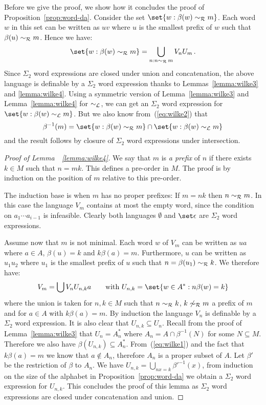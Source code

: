 \documentclass{LMCS}
\begin{document}
Before we give the proof, we show how it concludes the proof of
Proposition~\ref{prop:word-da}. Consider the set  $\set{w : \beta(w) \rgreensim
  m}$. Each word $w$ in this set can be written as $uv$ where $u$ is the
smallest prefix of $w$ such that $\beta(u) \sim_{\mathcal R} m$. Hence we have:
\[
   \set{w : \beta(w) \rgreensim m} = \bigcup_{n : n \rgreensim\,m} V_n U_m\,.
\]
Since $\Sigma_2$ word expressions are closed under union and concatenation, the
above language is definable by a $\Sigma_2$ word expression  thanks to
Lemmas~\ref{lemma:wilke3} and \ref{lemma:wilke4}.  Using a symmetric version of
Lemma~\ref{lemma:wilke3} and Lemma~\ref{lemma:wilke4} for $\sim_{\mathcal L}$, we can get
an $\Sigma_2$ word expression for $\set{w : \beta(w) \lgreensim m}$. But we also know
from~(\ref{eq:wilke2}) that
\[
  \beta^{-1}(m)= \set{w : \beta(w) \rgreensim m} \cap \set{w : \beta(w) \lgreensim m}
\]
and the result follows by closure of $\Sigma_2$ word expressions under
intersection.


\medskip
\begin{proof}[Proof of Lemma~~\ref{lemma:wilke4}]
  We say that $m$ is \emph{a prefix} of $n$ if there exists $k \in M$
  such that $n=mk$. This defines a pre-order in $M$. The proof is by
  induction on the position of $m$ relative to this pre-order.

  The induction base is when $m$ has no proper prefixes: If $m=nk$ then $n \sim_{\mathcal R} m$.
  In this case the language $V_m$ contains at most the empty word, since the
  condition on $a_1 \cdots a_{i-1}$ is infeasible.  Clearly both languages
  $\emptyset$ and $\set \epsilon$ are $\Sigma_2$ word expressions.

Assume now that $m$ is not minimal. Each word $w$ of $V_m$ can be written as
$ua$ where $a \in A$, $\beta(u)=k$ and $k\beta(a)=m$. Furthermore, $u$ can be
written as $u_1u_2$ where $u_1$ is the smallest prefix of $u$ such that
$n=\beta(u_1) \sim_{\mathcal R} k$. We therefore have:
\[
  V_m  =  \bigcup  V_n U_{n,k} a \qquad \mbox{with }  U_{n,k}=\set{ w \in A^* :
    n\beta(w)=k}
\]
where the union is taken for $n,k \in M$ such that $n \sim_{\mathcal R} k$,
$k \not \sim_{\mathcal R} m$ a prefix of $m$ and for $a \in A$ with $k
\beta(a)=m$. By induction the language $V_n$ is definable by a
$\Sigma_2$ word expression. It is also clear that $U_{n,k} \subseteq
U_n$. Recall from the proof of Lemma~\ref{lemma:wilke3} that
$U_n=A_n^*$ where $A_n=A \cap \beta^{-1}(N)$ for some $N \subseteq M$.
Therefore we also have $\beta(U_{n,k}) \subseteq A_n^*$.
From~(\ref{eq:wilke1}) and the fact that $k\beta(a)=m$ we know that $a
\not\in A_n$, therefore $A_n$ is a proper subset of $A$. Let $\beta'$
be the restriction of $\beta$ to $A_n$. We have
$U_{n,k}=\bigcup_{nx=k}\beta'^{-1}(x)$, from induction on the size of
the alphabet in Proposition~\ref{prop:word-da} we obtain a $\Sigma_2$
word expression for $U_{n,k}$. This concludes the proof of this lemma
as $\Sigma_2$ word expressions are closed under concatenation and union.
\end{proof}
\end{document}
